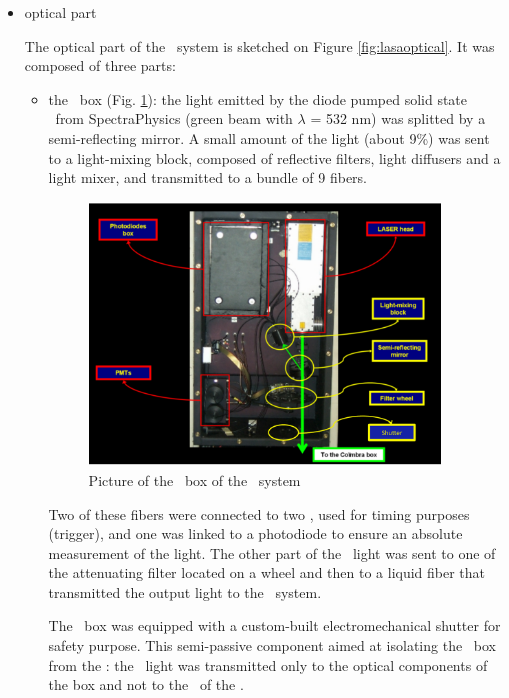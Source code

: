 \begin{itemize}
\item optical part 

	The optical part of the \lasi~system is sketched on Figure \ref{fig:lasaoptical}. It was composed of three parts:
	\begin{itemize}
	\item the \las~box (Fig. \ref{fig:lasabox}): the light emitted by the diode pumped solid state \las~from SpectraPhysics \cite{ref:laser} (green beam with $\lambda$ = 532 nm) was splitted by a semi-reflecting mirror. A small amount of the light (about 9\%) was sent to a light-mixing block, composed of reflective filters, light diffusers and a light mixer, and transmitted to a bundle of 9 fibers. \par
		\begin{figure}[htbp]
			\centering
			\includegraphics[height=7cm]{figures/LaserIBox.pdf}
			\caption{Picture of the \las~box of the \lasi~system}\label{fig:lasabox}
		\end{figure}	
			
		Two of these fibers were connected to two \pmts, used for timing purposes (trigger), and one was linked to a photodiode to ensure an absolute measurement of the light. The other part of the \las~light was sent to one of the attenuating filter located on a wheel and then to a liquid fiber that transmitted the output light to the \coimbra~system. \par
                 The \las~box was equipped with a custom-built electromechanical shutter for safety purpose. This semi-passive component aimed at isolating the \las~box from the \tilecal: the \las~light was transmitted only to the optical components of the box and not to the \pmt~of the \tilecal. 


\end{itemize}
\end{itemize}
